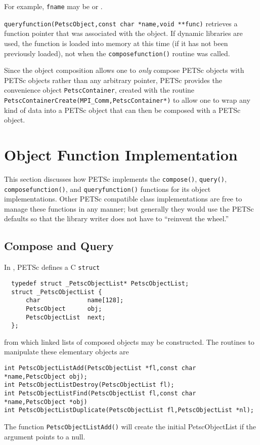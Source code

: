 \begin{tightitemize}
      For example, \lstinline{fname} may be  or
      .

\item \lstinline{queryfunction(PetscObject,const char *name,void **func)} retrieves a function pointer that
      was associated with the object. If dynamic libraries are used, the function is loaded
      into memory at this time (if it has not been previously loaded), not when the
      \lstinline{composefunction()} routine was called.

\end{tightitemize}

Since the object composition allows one to {\em only} compose PETSc objects
with PETSc objects rather than any arbitrary pointer, PETSc provides
the convenience object \lstinline{PetscContainer}, created with the
routine \lstinline{PetscContainerCreate(MPI_Comm,PetscContainer*)}
to allow one to wrap any kind of data into a PETSc object that can then be
composed with a PETSc object.

\section{Object Function Implementation}

This section discusses how PETSc implements the \lstinline{compose()}, \lstinline{query()}, 
\lstinline{composefunction()}, and \lstinline{queryfunction()} functions for its object implementations.
Other PETSc compatible class implementations are free to manage these functions in any
manner; but generally they would use the PETSc defaults so that the library writer does
not have to ``reinvent the wheel.''

\subsection{Compose and Query}
In \href{http://www.mcs.anl.gov/petsc/petsc-master/src/objects/olist.c.html}{}, PETSc defines a C \lstinline{struct}
\begin{lstlisting}
  typedef struct _PetscObjectList* PetscObjectList;
  struct _PetscObjectList {
      char             name[128];
      PetscObject      obj;
      PetscObjectList  next;
  };
\end{lstlisting}
from which linked lists of composed objects may be constructed. The routines
to manipulate these elementary objects are
\begin{lstlisting}
int PetscObjectListAdd(PetscObjectList *fl,const char *name,PetscObject obj);
int PetscObjectListDestroy(PetscObjectList fl);
int PetscObjectListFind(PetscObjectList fl,const char *name,PetscObject *obj)
int PetscObjectListDuplicate(PetscObjectList fl,PetscObjectList *nl);
\end{lstlisting}
The function \lstinline{PetscObjectListAdd()} will create the initial PetscObjectList if the argument
 points to a null.


